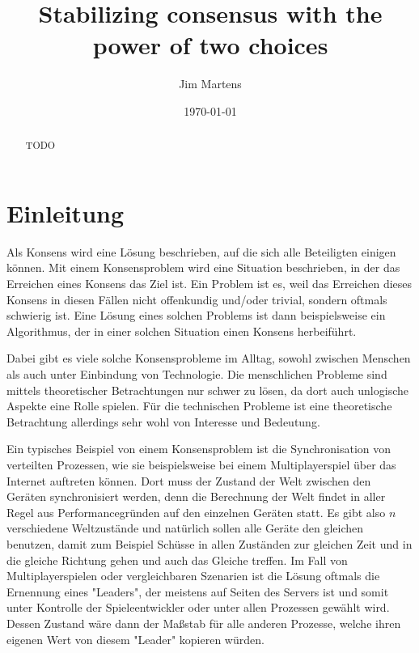 \documentclass[12pt,ngerman,a4paper]{scrartcl}
\title{Stabilizing consensus with the power of two choices}
\author{Jim Martens}
\date{\today}
\theoremstyle{plain}
\theoremstyle{definition}
\theoremstyle{remark}
\begin{document}
\maketitle

\begin{abstract}
TODO
\end{abstract}

\tableofcontents

\section{Einleitung}

Als Konsens wird eine Lösung beschrieben, auf die sich alle Beteiligten einigen
können. Mit einem Konsensproblem wird eine Situation beschrieben, in der das
Erreichen eines Konsens das Ziel ist. Ein Problem ist es, weil das Erreichen
dieses Konsens in diesen Fällen nicht offenkundig und/oder trivial, sondern
oftmals schwierig ist. Eine Lösung eines solchen Problems ist dann
beispielsweise ein Algorithmus, der in einer solchen Situation einen Konsens
herbeiführt.

Dabei gibt es viele solche Konsensprobleme im Alltag, sowohl zwischen Menschen
als auch unter Einbindung von Technologie. Die menschlichen Probleme sind
mittels theoretischer Betrachtungen nur schwer zu lösen, da dort auch unlogische
Aspekte eine Rolle spielen. Für die technischen Probleme ist eine theoretische
Betrachtung allerdings sehr wohl von Interesse und Bedeutung.

Ein typisches
Beispiel von einem Konsensproblem ist die Synchronisation von verteilten
Prozessen, wie sie beispielsweise bei einem Multiplayerspiel über das Internet
auftreten können. Dort muss der Zustand der Welt zwischen den Geräten
synchronisiert werden, denn die Berechnung der Welt findet in aller Regel aus
Performancegründen auf den einzelnen Geräten statt. Es gibt also $n$ verschiedene
Weltzustände und natürlich sollen alle Geräte den gleichen benutzen, damit
zum Beispiel Schüsse in allen Zuständen zur gleichen Zeit und in die gleiche
Richtung gehen und auch das Gleiche treffen. Im Fall von Multiplayerspielen
oder vergleichbaren Szenarien ist die Lösung oftmals die Ernennung eines "Leaders",
der meistens auf Seiten des Servers ist und somit unter Kontrolle der
Spieleentwickler oder unter allen Prozessen gewählt wird. Dessen Zustand wäre
dann der Maßstab für alle anderen Prozesse, welche ihren eigenen Wert von diesem
"Leader" kopieren würden.
\end{document}
